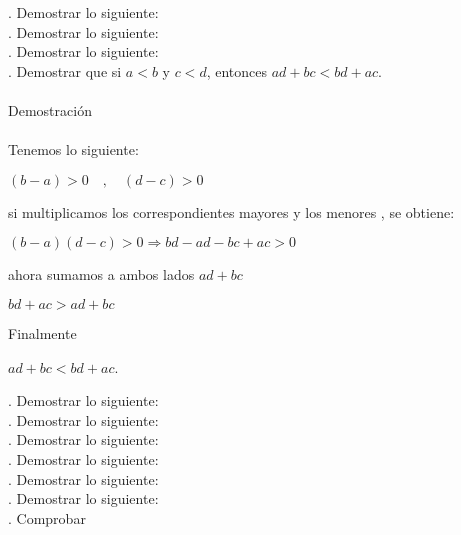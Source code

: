 \documentclass[12pt,a4paper,scrartcl]{article}
\begin{document}
{. Demostrar lo siguiente:\\ 



. Demostrar lo siguiente:\\ 



. Demostrar lo siguiente:\\ 




. Demostrar que si $a<b$ y $c<d$, entonces $ad+bc<bd+ac$.\\
\\Demostraci\'on\\
\\Tenemos lo siguiente:
\begin{center}
$(b-a)>0 \hspace{1em},\hspace{1em} (d-c)>0$ 
\end{center}
si multiplicamos los correspondientes mayores y los menores , se obtiene:
\begin{center}
$(b-a)(d-c)>0 \Rightarrow bd-ad-bc+ac>0$
\end{center}
ahora sumamos a ambos lados $ad+bc$\\
\begin{center}
$bd+ac>ad+bc$\\
\end{center}
Finalmente
\begin{center}
$ad+bc<bd+ac$.
\end{center}


. Demostrar lo siguiente:\\ 


. Demostrar lo siguiente:\\ 




. Demostrar lo siguiente:\\ 



. Demostrar lo siguiente:\\ 



. Demostrar lo siguiente:\\ 


. Demostrar lo siguiente:\\ 



. Comprobar\\


}
\end{document}
